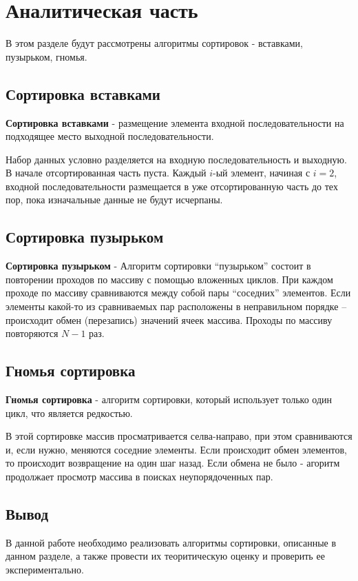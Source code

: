 \chapter{Аналитическая часть}
В этом разделе будут рассмотрены алгоритмы сортировок - вставками, пузырьком, гномья.

\section{Сортировка вставками}
\textbf{Сортировка вставками} \cite{insert-sort} - размещение элемента входной последовательности на подходящее место выходной последовательности.

Набор данных условно разделяется на входную последовательность и выходную. В начале отсортированная часть пуста. Каждый $i$-ый элемент, начиная с $i = 2$, входной последовательности размещается в уже отсортированную часть до тех пор, пока изначальные данные не будут исчерпаны.


\section{Сортировка пузырьком}
\textbf{Сортировка пузырьком} \cite{bubble-sort} - Алгоритм сортировки “пузырьком” состоит в повторении проходов по массиву с помощью вложенных циклов. При каждом проходе по массиву сравниваются между собой пары “соседних” элементов. Если элементы какой-то из сравниваемых пар расположены в неправильном порядке – происходит обмен (перезапись) значений ячеек массива. Проходы по массиву повторяются $N-1$ раз.


\section{Гномья сортировка}
\textbf{Гномья сортировка} \cite{gnomme-sort} - алгоритм сортировки, который использует только один цикл, что является редкостью.

В этой сортировке массив просматривается селва-направо, при этом сравниваются и, если нужно, меняются соседние элементы. Если происходит обмен элементов, то происходит возвращение на один шаг назад. Если обмена не было - агоритм продолжает просмотр массива в поисках неупорядоченных пар.

\section*{Вывод}
В данной работе необходимо реализовать алгоритмы сортировки, описанные в данном разделе, а также провести их теоритическую оценку и проверить ее экспериментально.